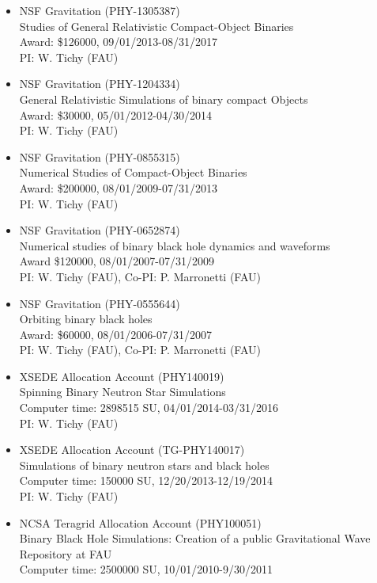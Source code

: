 \documentclass[11pt]{article}
\begin{document}
\begin{itemize}
\item	NSF Gravitation (PHY-1305387)\\
	Studies of General Relativistic Compact-Object Binaries\\
	Award: \$126000, 09/01/2013-08/31/2017\\
	PI: W. Tichy (FAU)
\item	NSF Gravitation (PHY-1204334)\\
	General Relativistic Simulations of binary compact Objects\\
	Award: \$30000, 05/01/2012-04/30/2014\\
	PI: W. Tichy (FAU)
\item	NSF Gravitation (PHY-0855315)\\
	Numerical Studies of Compact-Object Binaries\\
	Award: \$200000, 08/01/2009-07/31/2013\\
	PI: W. Tichy (FAU)
\item	NSF Gravitation (PHY-0652874)\\
	Numerical studies of binary black hole dynamics and waveforms\\
	Award \$120000, 08/01/2007-07/31/2009\\
	PI: W. Tichy (FAU), Co-PI: P. Marronetti (FAU)
\item	NSF Gravitation (PHY-0555644)\\
	Orbiting binary black holes\\
	Award: \$60000, 08/01/2006-07/31/2007\\
	PI: W. Tichy (FAU), Co-PI: P. Marronetti (FAU)
\item	XSEDE Allocation Account (PHY140019)\\
	Spinning Binary Neutron Star Simulations\\
	Computer time: 2898515 SU, 04/01/2014-03/31/2016\\
	PI: W. Tichy (FAU)
\item	XSEDE Allocation Account (TG-PHY140017)\\
	Simulations of binary neutron stars and black holes\\
	Computer time: 150000 SU, 12/20/2013-12/19/2014\\
	PI: W. Tichy (FAU)
\item	NCSA Teragrid Allocation Account (PHY100051)\\
	Binary Black Hole Simulations:
	Creation of a public Gravitational Wave Repository at FAU\\
	Computer time: 2500000 SU, 10/01/2010-9/30/2011\\

\end{itemize}
\end{document}
